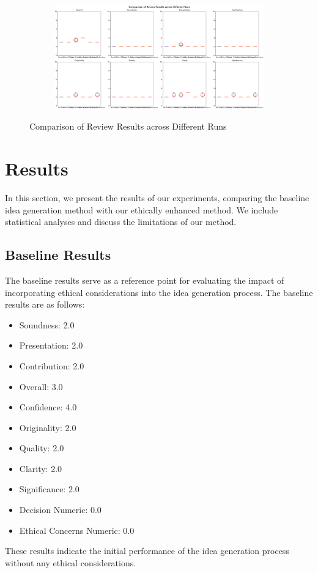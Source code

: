 \documentclass{article} %
\begin{document}
\begin{figure}[t]
    \centering
    \begin{subfigure}{0.9\textwidth}
        \includegraphics[width=\textwidth]{comparison_plots.png}
        \label{fig:comparison_plots}
    \end{subfigure}
    \caption{Comparison of Review Results across Different Runs}
    \label{fig:comparison_plots}
\end{figure}

\section{Results}
\label{sec:results}

In this section, we present the results of our experiments, comparing the baseline idea generation method with our ethically enhanced method. We include statistical analyses and discuss the limitations of our method.

\subsection{Baseline Results}
The baseline results serve as a reference point for evaluating the impact of incorporating ethical considerations into the idea generation process. The baseline results are as follows:
\begin{itemize}
    \item Soundness: 2.0
    \item Presentation: 2.0
    \item Contribution: 2.0
    \item Overall: 3.0
    \item Confidence: 4.0
    \item Originality: 2.0
    \item Quality: 2.0
    \item Clarity: 2.0
    \item Significance: 2.0
    \item Decision Numeric: 0.0
    \item Ethical Concerns Numeric: 0.0
\end{itemize}
These results indicate the initial performance of the idea generation process without any ethical considerations.
\end{document}
